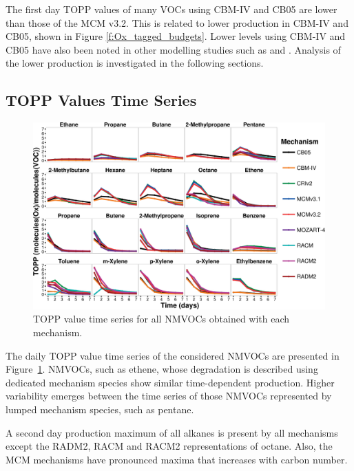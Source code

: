 The first day TOPP values of many VOCs using CBM-IV and CB05 are lower than those of the MCM v3.2. 
This is related to lower  production in CBM-IV and CB05, shown in Figure \ref{f:Ox_tagged_budgets}.
Lower  levels using CBM-IV and CB05 have also been noted in other modelling studies such as \citet{Luecken:2008, Emmerson:2009} and \citet{Saylor:2012}.
Analysis of the lower  production is investigated in the following sections.

\subsection{TOPP Values Time Series} \label{ss:profiles} %

\begin{figure}
    \begin{center}
        \includegraphics[width=\textwidth]{img/TOPP_daily_values_all_species}
    \end{center}
    \caption{TOPP value time series for all NMVOCs obtained with each mechanism.}
    \label{f:TOPP_dailies}
\end{figure}

The daily TOPP value time series of the considered NMVOCs are presented in \mbox{Figure \ref{f:TOPP_dailies}}. 
NMVOCs, such as ethene, whose degradation is described using dedicated mechanism species show similar time-dependent  production.
Higher variability emerges between the time series of those NMVOCs represented by lumped mechanism species, such as pentane.

A second day  production maximum of all alkanes is present by all mechanisms except the RADM2, RACM and RACM2 representations of octane. 
Also, the MCM mechanisms have pronounced maxima that increases with carbon number.

